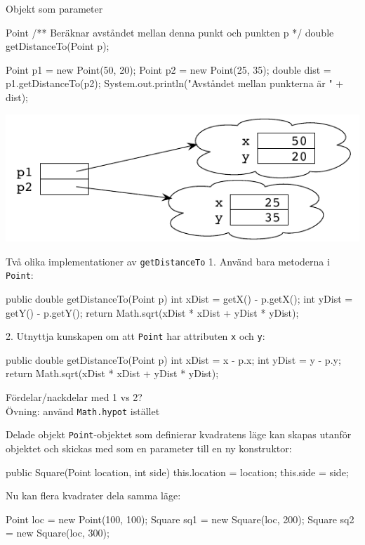 \documentclass{lecturenotes}
\begin{document}
\begin{Slide}{Objekt som parameter}
\begin{ClassSpec}{Point}
/** Beräknar avståndet mellan denna punkt och punkten p */
double getDistanceTo(Point p);
\end{ClassSpec}
\begin{Code}
Point p1 = new Point(50, 20);
Point p2 = new Point(25, 35);
double dist = p1.getDistanceTo(p2);
System.out.println("Avståndet mellan punkterna är " + dist);
\end{Code}
\begin{center}
\includegraphics[scale=0.8]{img/distobjects.pdf}
\end{center}
\end{Slide} 

\begin{Slide}{Två olika implementationer av \texttt{getDistanceTo}}
1. Använd bara metoderna i \texttt{Point}:
\begin{Code}
public double getDistanceTo(Point p) {
    int xDist = getX() - p.getX();
    int yDist = getY() - p.getY();
    return Math.sqrt(xDist * xDist + yDist * yDist);
}
\end{Code}

2. Utnyttja kunskapen om att \texttt{Point} har attributen \texttt{x} och \texttt{y}:
\begin{Code}
public double getDistanceTo(Point p) {
    int xDist = x - p.x;
    int yDist = y - p.y;
    return Math.sqrt(xDist * xDist + yDist * yDist);
}
\end{Code}
Fördelar/nackdelar med 1 vs 2?\\
Övning: använd \texttt{Math.hypot} istället
\end{Slide} 

\begin{Slide}{Delade objekt}
\texttt{Point}-objektet som definierar kvadratens läge kan skapas utanför objektet och skickas med som en parameter till en ny konstruktor:

\begin{Code}
public Square(Point location, int side) {
    this.location = location;
    this.side = side;
}
\end{Code}

Nu kan flera kvadrater dela samma läge:

\begin{Code}
Point loc = new Point(100, 100);
Square sq1 = new Square(loc, 200);
Square sq2 = new Square(loc, 300);
\end{Code}
\end{Slide} 
\end{document}
